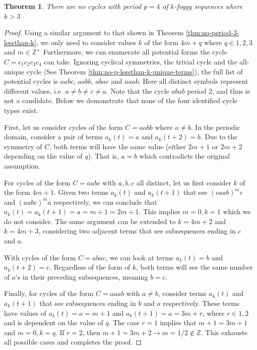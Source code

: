 \documentclass{article}
\newtheorem{theorem}{Theorem}
\begin{document}
\begin{theorem}
	There are no cycles with period $p = 4$ of $k$-foggy sequences where $k > 3$
	\label{thm:no-period-4-lessthan-k}
\end{theorem}

\begin{proof}
	Using a similar argument to that shown in Theorem \ref{thm:no-period-3-lessthan-k}, we only need to consider values $k$ of the form $4m + q$ where $q \in {1, 2, 3}$ and $m \in \mathbb{Z}^+$ Furthermore, we can enumerate all potential forms the cycle $C = c_1 c_2 c_3 c_4$ can take. Ignoring cyclical symmetries, the trivial cycle and the all-unique cycle (See Theorem \ref{thm:no-p-lessthan-k-unique-terms}), the full list of potential cycles is $aabc$, $aabb$, $abac$ and $aaab$. Here all distinct symbols represent different values, i.e. $a \neq b \neq c \neq a$. Note that the cycle $abab$ period 2, and thus is not a candidate. Below we demonstrate that none of the four identified cycle types exist.
	
	First, let us consider cycles of the form $C = aabb$ where $a \neq b$. In the periodic domain, consider a pair of terms $a_k(t) = a$ and $a_k(t+2) = b$. Due to the symmetry of $C$, both terms will have the same value (either $2m + 1$ or $2m + 2$ depending on the value of $q$). That is, $a=b$ which contradicts the original assumption.
	
	For cycles of the form $C = aabc$ with $a,b,c$ all distinct, let us first consider $k$ of the form $4m+1$. Given two terms $a_k(t)$ and $a_k(t+1)$ that see $(caab)^m c$ and $(aabc)^m a$ respectively, we can conclude that $a_k(t) = a_k(t+1) = a = m+1 = 2m+1$. This implies $m=0, k=1$ which we do not consider. The same argument can be extended to $k = 4m+2$ and $k = 4m+3$, considering two adjacent terms that see subsequences ending in $c$ and $a$.
	
	With cycles of the form $C = abac$, we can look at terms $a_k(t) = b$ and $a_k(t+2) = c$. Regardless of the form of $k$, both terms will see the same number of $a$'s in their preceding subsequences, meaning $b = c$.
	
	Finally, for cycles of the form $C = aaab$ with $a \neq b$, consider terms $a_k(t)$ and $a_k(t+1)$ that see subsequences ending in $b$ and $a$ respectively. These terms have values of $a_k(t) = a = m+1$ and $a_k(t+1) = a = 3m + r$, where $r \in {1, 2}$ and is dependent on the value of $q$. The case $r=1$ implies that $m+1 = 3m+1$ and $m=0, k=q$. If $r=2$, then $m+1 = 3m+2 \rightarrow m = 1/2 \notin \mathbb{Z}$. This exhausts all possible cases and completes the proof.
\end{proof}
\end{document}
